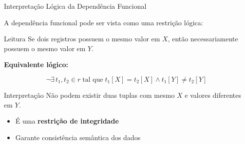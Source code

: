 \documentclass[9pt]{beamer}
\begin{document}
\begin{frame}{Interpretação Lógica da Dependência Funcional}

\small

A dependência funcional pode ser vista como uma restrição lógica:

\vspace{0.4cm}

\begin{block}{Leitura}
Se dois registros possuem o mesmo valor em $X$, então necessariamente possuem o mesmo valor em $Y$.
\end{block}

\vspace{0.4cm}

\textbf{Equivalente lógico:}

\[
\neg \exists\, t_1, t_2 \in r \;\text{tal que}\;
t_1[X] = t_2[X] \land t_1[Y] \neq t_2[Y]
\]

\vspace{0.4cm}

\begin{alertblock}{Interpretação}
Não podem existir duas tuplas com mesmo $X$ e valores diferentes em $Y$.
\end{alertblock}

\vspace{0.3cm}

\begin{itemize}
    \item É uma \textbf{restrição de integridade}
    \item Garante consistência semântica dos dados
\end{itemize}

\end{frame}
\end{document}
